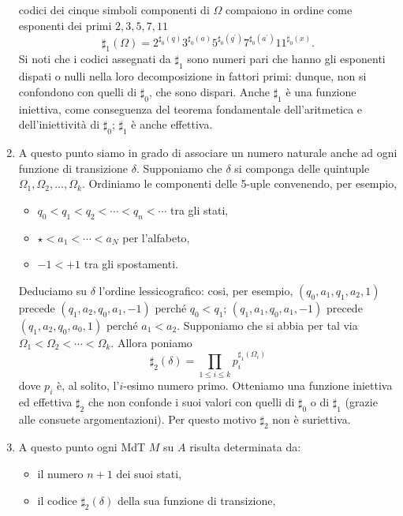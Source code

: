 \begin{enumerate}
          codici dei
          cinque simboli componenti di $\Omega$ compaiono in ordine come esponenti
          dei primi $2,3,5,7,11$
          $$
              \sharp_1(\Omega)=2^{\sharp_0(q)} 3^{\sharp_0(a)} 5^{\sharp_0\left(q^{\prime}\right)} 7^{\sharp_0\left(a^{\prime}\right)} 11^{\sharp_0(x)} .
          $$
          Si noti che i codici assegnati da $\sharp_1$ sono numeri pari che hanno gli
          esponenti dispati o nulli nella loro decomposizione in fattori primi:
          dunque, non si confondono con quelli di $\sharp_0$, che sono dispari. Anche
          $\sharp_1$ è una funzione iniettiva, come conseguenza del teorema
          fondamentale dell'aritmetica e dell'iniettività di $\sharp_0$; $\sharp_1$ è anche
          effettiva.
    \item A questo punto siamo in grado di associare un numero naturale anche ad ogni
          funzione di transizione $\delta$. Supponiamo che $\delta$ si componga delle
          quintuple $\Omega_1, \Omega_2, \ldots, \Omega_k$. Ordiniamo le componenti
          delle 5-uple convenendo, per esempio,
          \begin{itemize}
              \item $q_0<q_1<q_2<\cdots<q_n<\cdots$ tra gli stati,
              \item $\star<a_1<\cdots<a_N$ per l'alfabeto,
              \item $-1 < + 1$ tra gli spostamenti.
          \end{itemize}
          Deduciamo su $\delta$ l'ordine lessicografico: cosi, per esempio,
          $(q_0, a_1, q_1, a_2, 1)$ precede $(q_1, a_2, q_0, a_1,-1)$ perché
          $q_0 < q_1$; $\left(q_1, a_1, q_0, a_1,-1\right)$ precede
          $(q_1, a_2, q_0,a_0, 1)$ perché $a_1 < a_2$. Supponiamo che si
          abbia per tal via $\Omega_1<\Omega_2<\cdots<\Omega_k$. Allora poniamo
          $$
              \sharp_2(\delta)=\prod_{1 \leq i \leq k} p_i^{\sharp_1\left(\Omega_i\right)}
          $$
          dove $p_i$ è, al solito, l'$i$-esimo numero primo. Otteniamo una funzione
          iniettiva ed effettiva $\sharp_2$ che non confonde i suoi valori con quelli
          di $\sharp_0$ o di $\sharp_1$ (grazie alle consuete argomentazioni).
          Per questo motivo $\sharp_2$
          non è suriettiva.
    \item A questo punto ogni MdT $M$ su $A$ risulta determinata
          da:
          \begin{itemize}
              \item il numero $n+1$ dei suoi stati,
              \item il codice $\sharp_2(\delta)$ della sua funzione di transizione,
          \end{itemize}


\end{enumerate}
